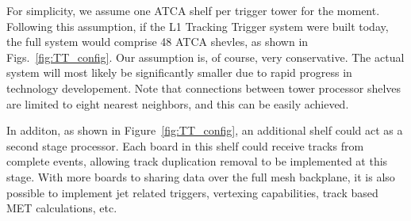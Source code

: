 \noindent 

For simplicity, we assume one ATCA shelf per trigger tower for the moment. Following this assumption, if the L1 Tracking Trigger system were built today, the full system would comprise 48 ATCA shevles, as shown in  Figs.~\ref{fig:TT_config}. Our assumption is, of course, very conservative.  The actual system will most likely be significantly smaller due to rapid progress in technology developement.
Note that connections between tower processor shelves are limited to eight nearest neighbors, and this can be easily achieved. 

In additon, as shown in Figure~\ref{fig:TT_config}, an additional shelf could act as a second stage processor.  Each board in this shelf could receive tracks from complete events, allowing track duplication removal to be implemented at this stage.  With more boards to sharing data over the full mesh backplane, it is also possible to implement jet related triggers, vertexing capabilities, track based MET calculations, etc.









